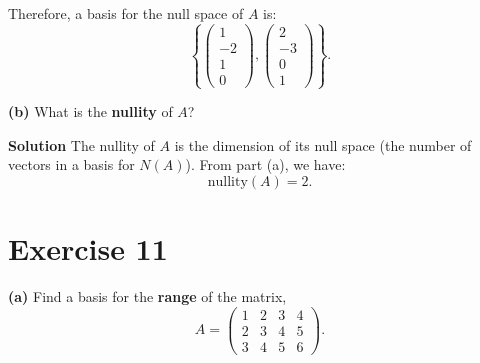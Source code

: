 \documentclass[12pt,a4paper]{article}
\begin{document}
Therefore, a basis for the null space of $A$ is:
\[
\left\{ \begin{pmatrix} 1 \\ -2 \\ 1 \\ 0 \end{pmatrix}, \begin{pmatrix} 2 \\ -3 \\ 0 \\ 1 \end{pmatrix} \right\}.
\]
\par\nopagebreak\vspace{1cm}

\Needspace{4cm}
\textbf{(b)} What is the \textbf{nullity} of $A$?

\textbf{Solution}
The nullity of $A$ is the dimension of its null space (the number of vectors in a basis for $N(A)$). From part (a), we have:
\[
\text{nullity}(A) = 2.
\]
\par\nopagebreak\vspace{1cm}

\Needspace{9cm}

\section*{Exercise 11}
\textbf{(a)} Find a basis for the \textbf{range} of the matrix,
\[
A=\begin{pmatrix}
1 & 2 & 3 & 4\\
2 & 3 & 4 & 5\\
3 & 4 & 5 & 6
\end{pmatrix}.
\]
\end{document}
